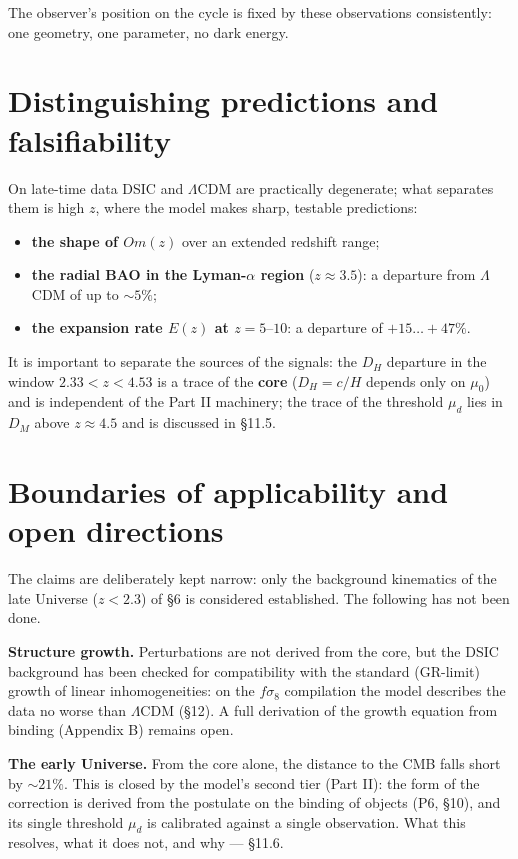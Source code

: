 \documentclass{article}
\begin{document}
The observer's position on the cycle is fixed by these observations consistently: one geometry, one parameter, no dark energy.

\section{Distinguishing predictions and falsifiability}

On late-time data DSIC and $\Lambda$CDM are practically degenerate; what separates them is high $z$, where the model makes sharp, testable predictions:
\begin{itemize}
  \item \textbf{the shape of $Om(z)$} over an extended redshift range;
  \item \textbf{the radial BAO in the Lyman-$\alpha$ region} ($z \approx 3.5$): a departure from $\Lambda$CDM of up to ${\sim}5\%$;
  \item \textbf{the expansion rate $E(z)$ at $z = 5\text{--}10$}: a departure of $+15\ldots+47\%$.
\end{itemize}
It is important to separate the sources of the signals: the $D_H$ departure in the window $2.33 < z < 4.53$ is a trace of the \textbf{core} ($D_H = c/H$ depends only on $\mu_0$) and is independent of the Part II machinery; the trace of the threshold $\mu_d$ lies in $D_M$ above $z \approx 4.5$ and is discussed in \S11.5.

\section{Boundaries of applicability and open directions}

The claims are deliberately kept narrow: only the background kinematics of the late Universe ($z < 2.3$) of \S6 is considered established. The following has not been done.

\medskip
\noindent\textbf{Structure growth.} Perturbations are not derived from the core, but the DSIC background has been checked for compatibility with the standard (GR-limit) growth of linear inhomogeneities: on the $f\sigma_8$ compilation the model describes the data no worse than $\Lambda$CDM (\S12). A full derivation of the growth equation from binding (Appendix B) remains open.

\medskip
\noindent\textbf{The early Universe.} From the core alone, the distance to the CMB falls short by ${\sim}21\%$. This is closed by the model's second tier (Part II): the form of the correction is derived from the postulate on the binding of objects (P6, \S10), and its single threshold $\mu_d$ is calibrated against a single observation. What this resolves, what it does not, and why --- \S11.6.
\end{document}
